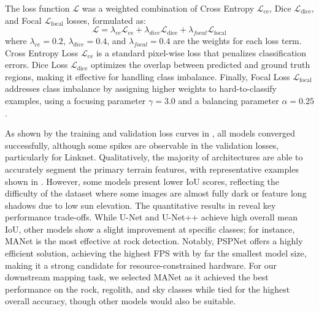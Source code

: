 The loss function $\mathcal{L}$ was a weighted combination of Cross Entropy $\mathcal{L}_{\text{ce}}$, Dice $\mathcal{L}_{\text{dice}}$, and Focal $\mathcal{L}_{\text{focal}}$ losses, formulated as:
\begin{equation}
	\mathcal{L} = \lambda_{ce} \mathcal{L}_{\text{ce}} + \lambda_{dice} \mathcal{L}_{\text{dice}} + \lambda_{focal} \mathcal{L}_{\text{focal}}
\end{equation}
where $\lambda_{ce}=0.2$, $\lambda_{dice}=0.4$, and $\lambda_{focal}=0.4$ are the weights for each loss term.
Cross Entropy Loss $\mathcal{L}_{\text{ce}}$ is a standard pixel-wise loss that penalizes classification errors. Dice Loss $\mathcal{L}_{\text{dice}}$ optimizes the overlap between predicted and ground truth regions, making it effective for handling class imbalance. Finally, Focal Loss $\mathcal{L}_{\text{focal}}$ addresses class imbalance by assigning higher weights to hard-to-classify examples, using a focusing parameter $\gamma = 3.0$ and a balancing parameter $\alpha = 0.25$.

As shown by the training and validation loss curves in , all models converged successfully, although some spikes are observable in the validation losses, particularly for Linknet. Qualitatively, the majority of architectures are able to accurately segment the primary terrain features, with representative examples shown in . However, some models present lower IoU scores, reflecting the difficulty of the dataset where some images are almost fully dark or feature long shadows due to low sun elevation. The quantitative results in  reveal key performance trade-offs. While U-Net and U-Net++ achieve high overall mean IoU, other models show a slight improvement at specific classes; for instance, MANet is the most effective at rock detection. Notably, PSPNet offers a highly efficient solution, achieving the highest FPS with by far the smallest model size, making it a strong candidate for resource-constrained hardware.
For our downstream mapping task, we selected MANet as it achieved the best performance on the rock, regolith, and sky classes while tied for the highest overall accuracy, though other models would also be suitable.

